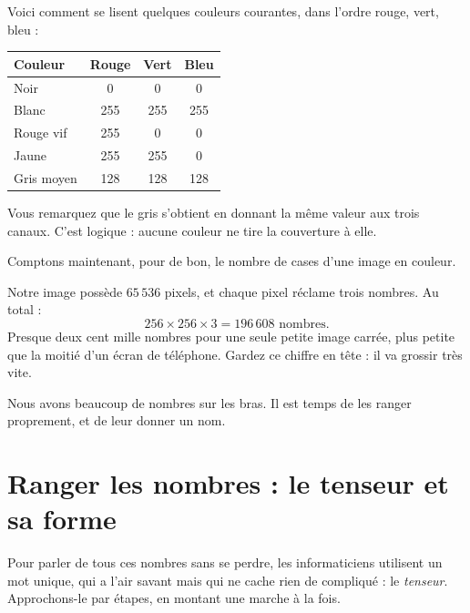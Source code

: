 \begin{exemple}
Voici comment se lisent quelques couleurs courantes, dans l'ordre
rouge, vert, bleu :

\begin{center}
\begin{tabular}{lccc}
\toprule
\textbf{Couleur} & \textbf{Rouge} & \textbf{Vert} & \textbf{Bleu} \\
\midrule
Noir           & 0   & 0   & 0   \\
Blanc          & 255 & 255 & 255 \\
Rouge vif      & 255 & 0   & 0   \\
Jaune          & 255 & 255 & 0   \\
Gris moyen     & 128 & 128 & 128 \\
\bottomrule
\end{tabular}
\end{center}

Vous remarquez que le gris s'obtient en donnant la même valeur aux trois
canaux. C'est logique : aucune couleur ne tire la couverture à elle.
\end{exemple}

Comptons maintenant, pour de bon, le nombre de cases d'une image en
couleur.

\begin{exemple}
Notre image possède $65\,536$ pixels, et chaque pixel réclame trois
nombres. Au total :
\[
  256 \times 256 \times 3 = 196\,608 \text{ nombres.}
\]
Presque deux cent mille nombres pour une seule petite image carrée, plus
petite que la moitié d'un écran de téléphone. Gardez ce chiffre en tête :
il va grossir très vite.
\end{exemple}

Nous avons beaucoup de nombres sur les bras. Il est temps de les ranger
proprement, et de leur donner un nom.

\section{Ranger les nombres : le tenseur et sa forme}

Pour parler de tous ces nombres sans se perdre, les informaticiens
utilisent un mot unique, qui a l'air savant mais qui ne cache rien de
compliqué : le \emph{tenseur}. Approchons-le par étapes, en montant une
marche à la fois.

